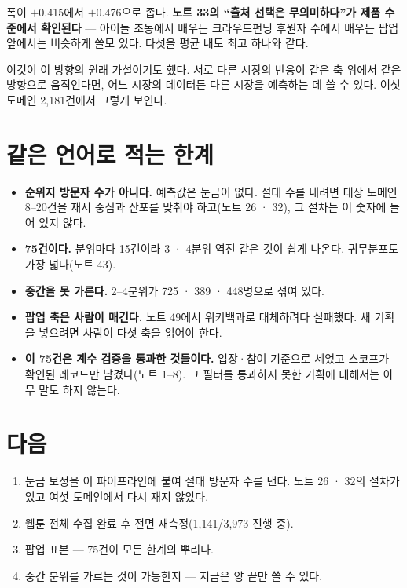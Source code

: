 \documentclass[10pt]{article}
\begin{document}
폭이 $+$0.415에서 $+$0.476으로 좁다. \textbf{노트 33의 ``출처 선택은 무의미하다''가
제품 수준에서 확인된다} --- 아이돌 초동에서 배우든 크라우드펀딩 후원자 수에서
배우든 팝업 앞에서는 비슷하게 쓸모 있다. 다섯을 평균 내도 최고 하나와 같다.

이것이 이 방향의 원래 가설이기도 했다. 서로 다른 시장의 반응이 같은 축 위에서
같은 방향으로 움직인다면, 어느 시장의 데이터든 다른 시장을 예측하는 데 쓸 수
있다. 여섯 도메인 2,181건에서 그렇게 보인다.

\section{같은 언어로 적는 한계}

\begin{itemize}[leftmargin=1.1em,itemsep=0.2em]
\item \textbf{순위지 방문자 수가 아니다.} 예측값은 눈금이 없다. 절대 수를 내려면
      대상 도메인 8--20건을 재서 중심과 산포를 맞춰야 하고(노트 26 · 32), 그
      절차는 이 숫자에 들어 있지 않다.
\item \textbf{75건이다.} 분위마다 15건이라 3 · 4분위 역전 같은 것이 쉽게 나온다.
      귀무분포도 가장 넓다(노트 43).
\item \textbf{중간을 못 가른다.} 2--4분위가 725 · 389 · 448명으로 섞여 있다.
\item \textbf{팝업 축은 사람이 매긴다.} 노트 49에서 위키백과로 대체하려다
      실패했다. 새 기획을 넣으려면 사람이 다섯 축을 읽어야 한다.
\item \textbf{이 75건은 계수 검증을 통과한 것들이다.} 입장·참여 기준으로 세었고
      스코프가 확인된 레코드만 남겼다(노트 1--8). 그 필터를 통과하지 못한
      기획에 대해서는 아무 말도 하지 않는다.
\end{itemize}

\section{다음}

\begin{enumerate}[leftmargin=1.3em,itemsep=0.15em]
\item 눈금 보정을 이 파이프라인에 붙여 절대 방문자 수를 낸다. 노트 26 · 32의
      절차가 있고 여섯 도메인에서 다시 재지 않았다.
\item 웹툰 전체 수집 완료 후 전면 재측정(1,141/3,973 진행 중).
\item 팝업 표본 --- 75건이 모든 한계의 뿌리다.
\item 중간 분위를 가르는 것이 가능한지 --- 지금은 양 끝만 쓸 수 있다.
\end{enumerate}
\end{document}
